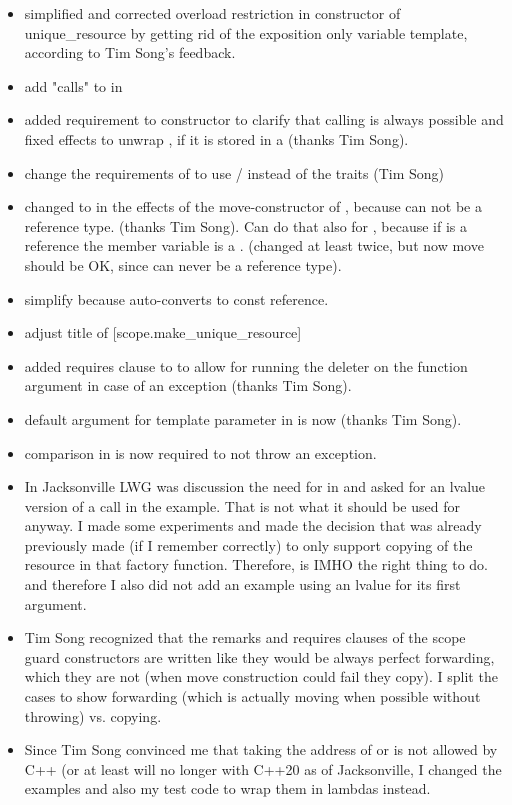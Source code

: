 \documentclass[ebook,11pt,article]{memoir}
\begin{document}
\begin{itemize}
\item simplified and corrected overload restriction in constructor of unique_resource by getting rid of the exposition only variable template,  according to Tim Song's feedback.
\item add "calls" to  in 
\item added requirement to  constructor to clarify that calling  is always possible and fixed effects to unwrap , if it is stored in a  (thanks Tim Song).
\item change the requirements of  to use / instead of the traits (Tim Song)
\item changed  to  in the effects of the move-constructor of , because  can not be a reference type. (thanks Tim Song). Can do that also for , because if  is a reference the member variable is a . (changed at least twice, but now move should be OK, since  can never be a reference type).
\item simplify  because  auto-converts to const reference.
\item adjust title of [scope.make_unique_resource]
\item added requires clause to  to allow for running the deleter on the function argument in case of an exception (thanks Tim Song).
\item default argument for template parameter  in  is now  (thanks Tim Song).
\item comparison in  is now required to not throw an exception.
\item In Jacksonville LWG was discussion the need for  in  and asked for an lvalue version of a call in the example. That is not what it should be used for anyway. I made some experiments and made the decision that was already previously made (if I remember correctly) to only support copying of the resource in that factory function. Therefore,  is IMHO the right thing to do. and therefore I also did not add an example using an lvalue for its first argument.
\item Tim Song recognized that the remarks and requires clauses of the scope guard constructors are written like they would be always perfect forwarding, which they are not (when move construction could fail they copy). I split the cases to show forwarding (which is actually moving when possible without throwing) vs. copying.
\item Since Tim Song convinced me that taking the address of  or  is not allowed by C++ (or at least will no longer with C++20 as of Jacksonville, I changed the examples and also my test code to wrap them in lambdas instead.
\end{itemize}
\end{document}
